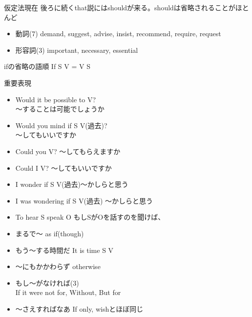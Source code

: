\documentclass[10pt]{jsarticle}
\newcommand{\answer}[2]{{\color{orange}#2}}
\newcommand{\answer}[2]{\vspace{#1mm}}
\begin{document}
\begin{itembox}[l]{仮定法現在}
	\answer{0}{後ろに続くthat説にはshouldが来る。shouldは省略されることがほとんど}
	\begin{itemize}
		\item 動詞(7) \answer{5}{demand, suggest, advise, insist, recommend, require, request}
		\item 形容詞(3) \answer{5}{important, necessary, essential}
	\end{itemize}
\end{itembox}

\begin{itembox}[l]{ifの省略の語順}
	\answer{10}{If S V = V S}
\end{itembox}

\begin{itembox}[l]{重要表現}
	\begin{multicols}{2}
		\begin{itemize}
			\item Would it be possible to V? \answer{5}{\\〜することは可能でしょうか}
			\item Would you mind if S V(過去)? \answer{5}{\\〜してもいいですか}
			\item Could you V? \answer{5}{〜してもらえますか}
			\item Could I V? \answer{5}{〜してもいいですか}
			\item I wonder if S V(過去)\answer{5}{〜かしらと思う}
			\item I was wondering if S V(過去) \answer{5}{〜かしらと思う}
			\item To hear S speak O \answer{5}{もしSがOを話すのを聞けば、}
		\end{itemize}
	\end{multicols}
	\begin{multicols}{2}
		\begin{itemize}
			\item まるで〜 \answer{5}{as if(though)}
			\item もう〜する時間だ \answer{5}{It is time S V\\}
			\item 〜にもかかわらず \answer{5}{otherwise}
			\item もし〜がなければ(3) \answer{8}{\\If it were not for, Without, But for}
			\item 〜さえすればなあ \answer{5}{If only, wishとほぼ同じ}
		\end{itemize}
	\end{multicols}
\end{itembox}
\end{document}
